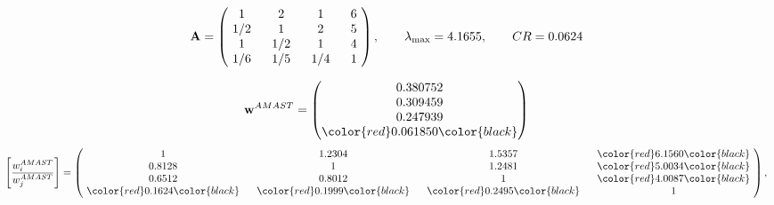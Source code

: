 \begin{example}
\begin{equation*}
\mathbf{A} =
\begin{pmatrix}
$\,\,$ 1 $\,\,$ & $\,\,$2$\,\,$ & $\,\,$1$\,\,$ & $\,\,$6 $\,\,$ \\
$\,\,$ 1/2$\,\,$ & $\,\,$ 1 $\,\,$ & $\,\,$2$\,\,$ & $\,\,$5 $\,\,$ \\
$\,\,$ 1 $\,\,$ & $\,\,$ 1/2$\,\,$ & $\,\,$ 1 $\,\,$ & $\,\,$4 $\,\,$ \\
$\,\,$ 1/6$\,\,$ & $\,\,$ 1/5$\,\,$ & $\,\,$ 1/4$\,\,$ & $\,\,$ 1  $\,\,$ \\
\end{pmatrix},
\qquad
\lambda_{\max} =
4.1655,
\qquad
CR = 0.0624
\end{equation*}

\begin{equation*}
\mathbf{w}^{AMAST} =
\begin{pmatrix}
0.380752\\
0.309459\\
0.247939\\
\color{red} 0.061850\color{black}
\end{pmatrix}\end{equation*}
\begin{equation*}
\left[ \frac{{w}^{AMAST}_i}{{w}^{AMAST}_j} \right] =
\begin{pmatrix}
$\,\,$ 1 $\,\,$ & $\,\,$1.2304$\,\,$ & $\,\,$1.5357$\,\,$ & $\,\,$\color{red} 6.1560\color{black} $\,\,$ \\
$\,\,$0.8128$\,\,$ & $\,\,$ 1 $\,\,$ & $\,\,$1.2481$\,\,$ & $\,\,$\color{red} 5.0034\color{black}   $\,\,$ \\
$\,\,$0.6512$\,\,$ & $\,\,$0.8012$\,\,$ & $\,\,$ 1 $\,\,$ & $\,\,$\color{red} 4.0087\color{black}  $\,\,$ \\
$\,\,$\color{red} 0.1624\color{black} $\,\,$ & $\,\,$\color{red} 0.1999\color{black} $\,\,$ & $\,\,$\color{red} 0.2495\color{black} $\,\,$ & $\,\,$ 1  $\,\,$ \\
\end{pmatrix},
\end{equation*}


\end{example}

